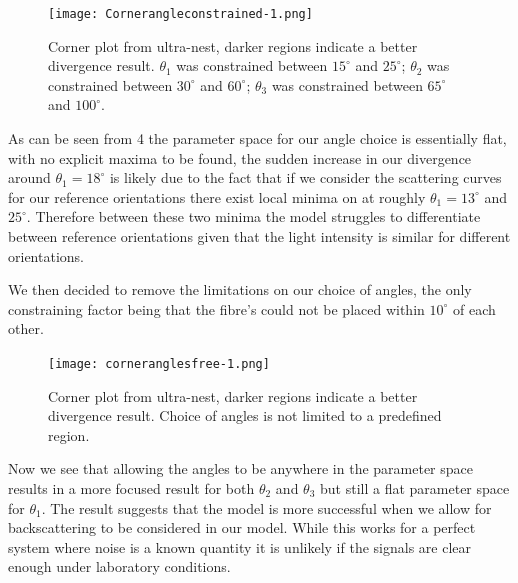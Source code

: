 \documentclass[11pt]{article}
\begin{document}
	\begin{figure} [t]
		\centering
		\texttt{[image: Cornerangleconstrained-1.png]}
		\caption{Corner plot from ultra-nest, darker regions indicate a better divergence result. $\theta_1$ was constrained between $15^{\circ}$ and $25^{\circ}$; $\theta_2$ was constrained between $30^{\circ}$ and $60^{\circ}$; $\theta_3$ was constrained between $65^{\circ}$ and $100^{\circ}$.}
	\end{figure}
	As can be seen from \figurename{ 4} the parameter space for our angle choice is essentially flat, with no explicit maxima to be found, the sudden increase in our divergence around $\theta_1 = 18^{\circ}$ is likely due to the fact that if we consider the scattering curves for our reference orientations there exist local minima on at roughly $\theta_1 = 13^{\circ}$ and $25^{\circ}$. Therefore between these two minima the model struggles to differentiate between reference orientations given that the light intensity is similar for different orientations. 
	
	We then decided to remove the limitations on our choice of angles, the only constraining factor being that the fibre's could not be placed within $10^{\circ}$ of each other. 
	
	\begin{figure} [h]
		\centering
		\texttt{[image: corneranglesfree-1.png]}
		\caption{Corner plot from ultra-nest, darker regions indicate a better divergence result. Choice of angles is not limited to a predefined region.}
	\end{figure}

	Now we see that allowing the angles to be anywhere in the parameter space results in a more focused result for both $\theta_2$ and $\theta_3$ but still a flat parameter space for $\theta_1$. The result suggests that the model is more successful when we allow for backscattering to be considered in our model. While this works for a perfect system where noise is a known quantity it is unlikely if the signals are clear enough under laboratory conditions. 
	
\end{document}
